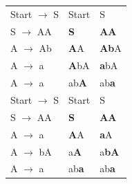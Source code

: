 \begin{solution}
\begin{enumerate}
\begin{table}[h]
\begin{tabular}{l|l|l}
                \hline
                Start $\to$ S & Start & S\\
                S $\to$ AA & \textbf{S} & \textbf{AA}\\
                A $\to$ Ab & \textbf{A}A & \textbf{Ab}A\\
                A $\to$ a & \textbf{A}bA & \textbf{a}bA\\
                A $\to$ a & ab\textbf{A} & ab\textbf{a}\\
                \hline
                Start $\to$ S & Start & S\\
                S $\to$ AA & \textbf{S} & \textbf{AA}\\
                A $\to$ a & \textbf{A}A & \textbf{a}A\\
                A $\to$ bA & a\textbf{A} & a\textbf{bA}\\
                A $\to$ a & ab\textbf{a} & ab\textbf{a}
            \end{tabular}
        \end{table}
    \end{enumerate}
\end{solution}
